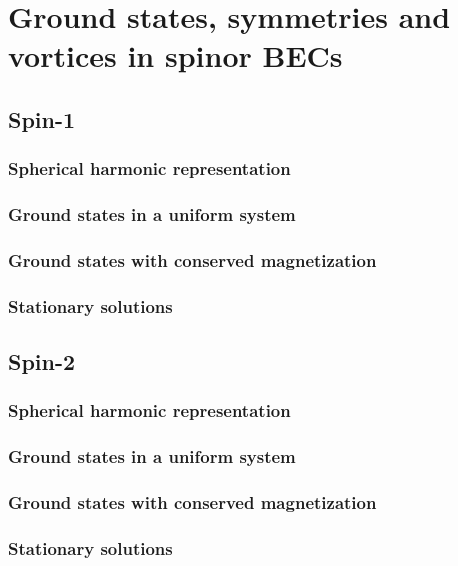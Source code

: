 \chapter{Ground states, symmetries and vortices in spinor BECs}

\section{Spin-1}

\subsection{Spherical harmonic representation}

\subsection{Ground states in a uniform system}

\subsection{Ground states with conserved magnetization}

\subsection{Stationary solutions}

\section{Spin-2}

\subsection{Spherical harmonic representation}

\subsection{Ground states in a uniform system}

\subsection{Ground states with conserved magnetization}

\subsection{Stationary solutions}

